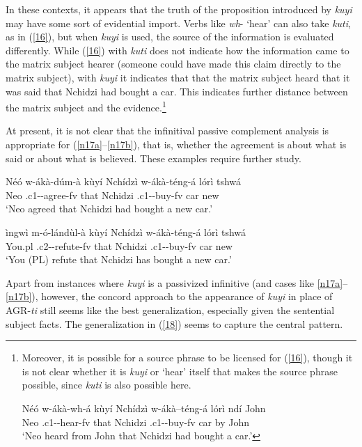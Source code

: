 \documentclass[output=paper,
modfonts
]{langscibook}
\begin{document}
In these contexts, it appears that the truth of the proposition introduced by \textit{kuyi} may have some sort of evidential import. Verbs like \textit{wh}- `hear' can also take \textit{kuti}, as in (\ref{16}), but when \textit{kuyi} is used, the source of the information is evaluated differently. While (\ref{16}) with \textit{kuti} does not indicate how the information came to the matrix subject hearer (someone could have made this claim directly to the matrix subject), with \textit{kuyi} it indicates that that the matrix subject heard that it was said that Nchidzi had bought a car. This indicates further distance between the matrix subject and the evidence.\footnote{Moreover, it is possible for a source phrase to be licensed for (\ref{16}), though it is not clear whether it is \textit{kuyi} or `hear' itself that makes the source phrase possible, since \textit{kuti} is also possible here. 

\ea \gll Néó w-ákà-wh-á kùyí Nchídzì  w-ákà–téng-á lórì ndí  John\\
Neo .c1--hear-fv	that Nchidzi .c1--buy-fv car by John\\
\glt `Neo heard from John that Nchidzi had bought a car.' \z 
} 

At present, it is not clear that the infinitival passive complement analysis is appropriate for (\ref{n17a}--\ref{n17b}), that is, whether the agreement is about what is said or about what is believed. These examples require further study. 

\ea\label{n17} 
\ea \label{n17a} \gll Néó w-ákà-dúm-à kùyí Nchídzì w-ákà-téng-á lórì tshwá\\
	Neo	.c1--agree-fv that  Nchidzi  .c1--buy-fv car new\\
	\glt `Neo agreed that Nchidzi had bought a new car.'

\ex\label{n17b}  \gll ìngwì 	m-ó-lándùl-à kùyí Nchídzì  w-ákà-téng-á lórì tshwá\\
	You.pl .c2--refute-fv that Nchidzi  .c1--buy-fv car new\\
	\glt `You (PL) refute that Nchidzi has bought a new car.'  \z \z  


Apart from instances where \textit{kuyi} is a passivized infinitive (and cases like \ref{n17a}--\ref{n17b}), however, the concord approach to the appearance of \textit{kuyi} in place of AGR-\textit{ti} still seems like the best generalization, especially given the sentential subject facts. The generalization in (\ref{18}) seems to capture the central pattern.
\end{document}
